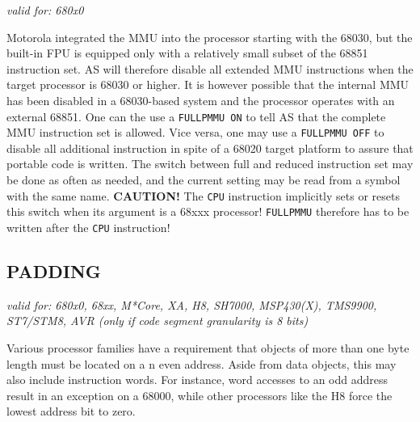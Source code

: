 \documentclass[12pt,twoside]{report}
\makeatletter
\newcommand{\bb}[1]{{\bf #1}}
\newcommand{\tty}[1]{{\tt #1}}
\newcommand{\ttindex}[1]{\index{#1@{\tt #1}}}
\makeatother
\begin{document}
{\em valid for: 680x0}

Motorola integrated the MMU into the processor starting with the 68030, but
the built-in FPU is equipped only with a relatively small subset of the
68851 instruction set.  AS will therefore disable all extended MMU
instructions when the target processor is 68030 or higher.  It is however
possible that the internal MMU has been disabled in a 68030-based system
and the processor operates with an external 68851.  One can the use a
\tty{FULLPMMU ON} to tell AS that the complete MMU instruction set is
allowed.  Vice versa, one may use a \tty{FULLPMMU OFF} to disable all
additional instruction in spite of a 68020 target platform to assure that
portable code is written.  The switch between full and reduced instruction
set may be done as often as needed, and the current setting may be read
from a symbol with the same name.  \bb{CAUTION!} The \tty{CPU} instruction
implicitly sets or resets this switch when its argument is a 68xxx
processor!  \tty{FULLPMMU} therefore has to be written after the \tty{CPU}
instruction!


\subsection{PADDING}
\ttindex{PADDING}

{\em valid for: 680x0, 68xx, M*Core, XA, H8, SH7000, MSP430(X), TMS9900,\\
      ST7/STM8, AVR (only if code segment granularity is 8 bits)}

Various processor families have a requirement that objects of more than
one byte length must be located on a n even address.  Aside from data
objects, this may also include instruction words.  For instance, word
accesses to an odd address result in an exception on a 68000, while other
processors like the H8 force the lowest address bit to zero.
\end{document}
